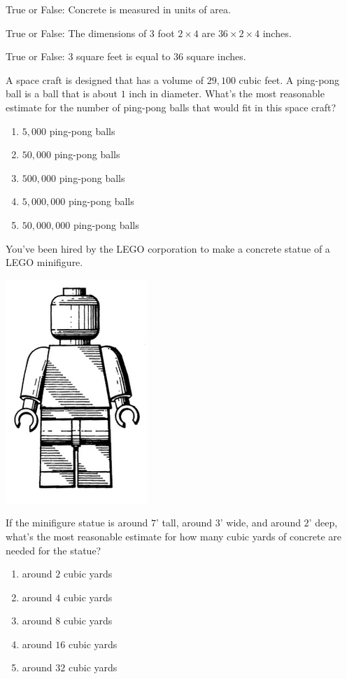 \documentclass{ximera}
\author{Bart Snapp}
\begin{document}
\maketitle


\begin{exercise}
  True or False: Concrete is measured in units of area.
\end{exercise}
\vfill

\begin{exercise}
  True or False: The dimensions of $3$ foot $2\times 4$ are $36\times
  2\times 4$ inches.
\end{exercise}
\vfill

\begin{exercise}
  True or False: $3$ square feet is equal to $36$ square inches.
 \end{exercise}
\vfill


\begin{exercise}
  A space craft is designed that has a volume of $29,100$ cubic feet.
  A ping-pong ball is a ball that is about $1$ inch in diameter.
  What's the most reasonable estimate for the number of ping-pong
  balls that would fit in this space craft?
  \begin{enumerate}
  \item $5,000$ ping-pong balls
  \item $50,000$ ping-pong balls
  \item $500,000$ ping-pong balls
  \item $5,000,000$ ping-pong balls
  \item $50,000,000$ ping-pong balls
  \end{enumerate}

\end{exercise}
\vfill


\begin{exercise}
  You've been hired by the LEGO corporation to make a concrete statue
  of a LEGO minifigure.
  \begin{center}
    \includegraphics[width=.5in]{minifigure.png}
  \end{center}
  If the minifigure statue is around $7$' tall, around $3$' wide, and
  around $2$' deep, what's the most reasonable estimate for how many
  cubic yards of concrete are needed for the statue?
  \begin{enumerate}
  \item around $2$ cubic yards
  \item around $4$ cubic yards
  \item around $8$ cubic yards
  \item around $16$ cubic yards
  \item around $32$ cubic yards
  \end{enumerate}
\end{exercise}
\vfill





\end{document}
